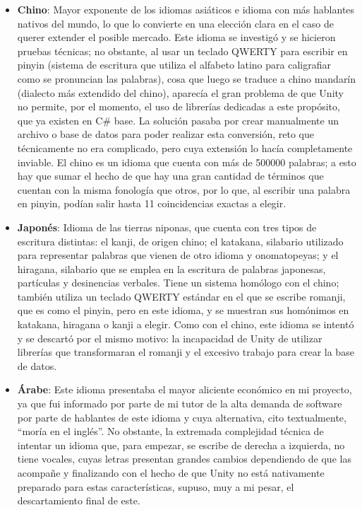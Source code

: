 \begin{itemize}
	\item \textbf{Chino}: Mayor exponente de los idiomas asiáticos e idioma con más hablantes nativos del mundo, lo que lo convierte en una elección clara en el caso de querer extender el posible mercado. Este idioma se investigó y se hicieron pruebas técnicas; no obstante, al usar un teclado QWERTY para escribir en pinyin (sistema de escritura que utiliza el alfabeto latino para caligrafiar como se pronuncian las palabras), cosa que luego se traduce a chino mandarín (dialecto más extendido del chino), aparecía el gran problema de que Unity no permite, por el momento, el uso de librerías dedicadas a este propósito, que ya existen en C\# base. La solución pasaba por crear manualmente un archivo o base de datos para poder realizar esta conversión, reto que técnicamente no era complicado, pero cuya extensión lo hacía completamente inviable. El chino es un idioma que cuenta con más de 500000 palabras; a esto hay que sumar el hecho de que hay una gran cantidad de términos que cuentan con la misma fonología que otros, por lo que, al escribir una palabra en pinyin, podían salir hasta 11 coincidencias exactas a elegir.
	\item \textbf{Japonés}: Idioma de las tierras niponas, que cuenta con tres tipos de escritura distintas: el kanji, de origen chino; el katakana, silabario utilizado para representar palabras que vienen de otro idioma y onomatopeyas; y el hiragana, silabario que se emplea en la escritura de palabras japonesas, partículas y desinencias verbales. Tiene un sistema homólogo con el chino; también utiliza un teclado QWERTY estándar en el que se escribe romanji, que es como el pinyin, pero en este idioma, y se muestran sus homónimos en katakana, hiragana o kanji a elegir. Como con el chino, este idioma se intentó y se descartó por el mismo motivo: la incapacidad de Unity de utilizar librerías que transformaran el romanji y el excesivo trabajo para crear la base de datos.
	\item \textbf{Árabe}: Este idioma presentaba el mayor aliciente económico en mi proyecto, ya que fui informado por parte de mi tutor de la alta demanda de software por parte de hablantes de este idioma y cuya alternativa, cito textualmente, ``moría en el inglés''. No obstante, la extremada complejidad técnica de intentar un idioma que, para empezar, se escribe de derecha a izquierda, no tiene vocales, cuyas letras presentan grandes cambios dependiendo de que las acompañe y finalizando con el hecho de que Unity no está nativamente preparado para estas características, supuso, muy a mi pesar, el descartamiento final de este.
\end{itemize}


